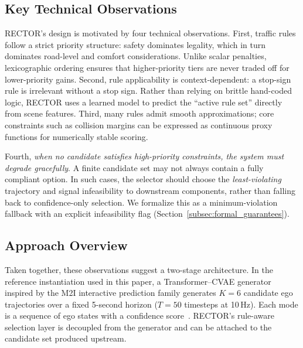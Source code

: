 \subsection{Key Technical Observations}
\label{subsec:observations}

RECTOR’s design is motivated by four technical observations. First, traffic rules follow a strict priority structure: safety dominates legality, which in turn dominates road-level and comfort considerations.  Unlike scalar penalties, lexicographic ordering ensures that higher-priority tiers are never traded off for lower-priority gains. Second, rule applicability is context-dependent: a stop-sign rule is irrelevant without a stop sign.  Rather than relying on brittle hand-coded logic, \textsc{RECTOR} uses a learned model to predict the ``active rule set'' directly from scene features. Third, many rules admit smooth approximations; core constraints such as collision margins can be expressed as continuous proxy functions for numerically stable scoring.

Fourth, \emph{when no candidate satisfies high-priority constraints, the system must degrade gracefully}. A finite candidate set may not always contain a fully compliant option.  In such cases, the selector should choose the \emph{least-violating} trajectory and signal infeasibility to downstream components, rather than falling back to confidence-only selection.  We formalize this as a minimum-violation fallback with an explicit infeasibility flag (Section~\ref{subsec:formal_guarantees}).

\subsection{Approach Overview}
\label{subsec:approach}

Taken together, these observations suggest a two-stage architecture. In the reference instantiation used in this paper, a Transformer--CVAE generator inspired by the M2I interactive prediction family generates $K=6$ candidate ego trajectories over a fixed 5-second horizon ($T=50$ timesteps at 10\,Hz). Each mode is a sequence of ego states with a confidence score~\cite{Sun_2022}.  RECTOR's rule-aware selection layer is decoupled from the generator and can be attached to the candidate set produced upstream.

